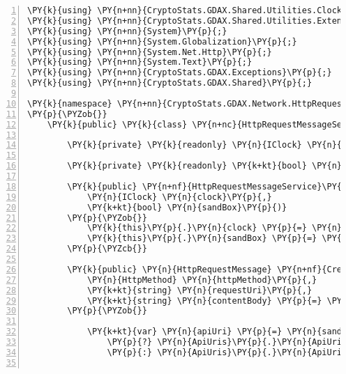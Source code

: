 \def\PYZbs{\char`\\}
\def\PYZus{\char`\_}
\def\PYZob{\char`\{}
\def\PYZcb{\char`\}}
\def\PYZca{\char`\^}
\def\PYZam{\char`\&}
\def\PYZlt{\char`\<}
\def\PYZgt{\char`\>}
\def\PYZsh{\char`\#}
\def\PYZpc{\char`\%}
\def\PYZdl{\char`\$}
\def\PYZhy{\char`\-}
\def\PYZsq{\char`\'}
\def\PYZdq{\char`\"}
\def\PYZti{\char`\~}
\def\PYZat{@}
\def\PYZlb{[}
\def\PYZrb{]}
\makeatother\begin{Verbatim}[commandchars=\\\{\},numbers=left,firstnumber=1,stepnumber=1,numberblanklines=0]
\PY{k}{using} \PY{n+nn}{CryptoStats.GDAX.Shared.Utilities.Clock}\PY{p}{;}
\PY{k}{using} \PY{n+nn}{CryptoStats.GDAX.Shared.Utilities.Extensions}\PY{p}{;}
\PY{k}{using} \PY{n+nn}{System}\PY{p}{;}
\PY{k}{using} \PY{n+nn}{System.Globalization}\PY{p}{;}
\PY{k}{using} \PY{n+nn}{System.Net.Http}\PY{p}{;}
\PY{k}{using} \PY{n+nn}{System.Text}\PY{p}{;}
\PY{k}{using} \PY{n+nn}{CryptoStats.GDAX.Exceptions}\PY{p}{;}
\PY{k}{using} \PY{n+nn}{CryptoStats.GDAX.Shared}\PY{p}{;}

\PY{k}{namespace} \PY{n+nn}{CryptoStats.GDAX.Network.HttpRequest}
\PY{p}{\PYZob{}}
    \PY{k}{public} \PY{k}{class} \PY{n+nc}{HttpRequestMessageService} \PY{p}{:} \PY{n}{IHttpRequestMessageService}\PY{p}{\PYZob{}}

        \PY{k}{private} \PY{k}{readonly} \PY{n}{IClock} \PY{n}{clock}\PY{p}{;}

        \PY{k}{private} \PY{k}{readonly} \PY{k+kt}{bool} \PY{n}{sandBox}\PY{p}{;}

        \PY{k}{public} \PY{n+nf}{HttpRequestMessageService}\PY{p}{(}
            \PY{n}{IClock} \PY{n}{clock}\PY{p}{,}
            \PY{k+kt}{bool} \PY{n}{sandBox}\PY{p}{)}
        \PY{p}{\PYZob{}}
            \PY{k}{this}\PY{p}{.}\PY{n}{clock} \PY{p}{=} \PY{n}{clock}\PY{p}{;}
            \PY{k}{this}\PY{p}{.}\PY{n}{sandBox} \PY{p}{=} \PY{n}{sandBox}\PY{p}{;}
        \PY{p}{\PYZcb{}}

        \PY{k}{public} \PY{n}{HttpRequestMessage} \PY{n+nf}{CreateHttpRequestMessage}\PY{p}{(}
            \PY{n}{HttpMethod} \PY{n}{httpMethod}\PY{p}{,}
            \PY{k+kt}{string} \PY{n}{requestUri}\PY{p}{,}
            \PY{k+kt}{string} \PY{n}{contentBody} \PY{p}{=} \PY{l+s}{\PYZdq{}\PYZdq{}}\PY{p}{)}
        \PY{p}{\PYZob{}}

            \PY{k+kt}{var} \PY{n}{apiUri} \PY{p}{=} \PY{n}{sandBox}
                \PY{p}{?} \PY{n}{ApiUris}\PY{p}{.}\PY{n}{ApiUriSandbox}
                \PY{p}{:} \PY{n}{ApiUris}\PY{p}{.}\PY{n}{ApiUri}\PY{p}{;}


\end{Verbatim}
